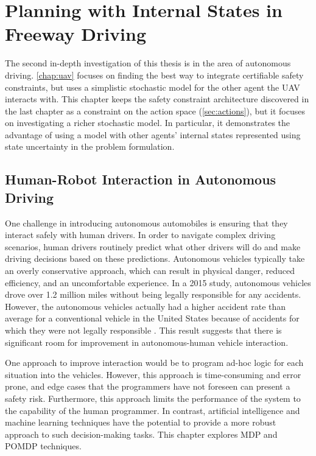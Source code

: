 \chapter{Planning with Internal States in Freeway Driving} \label{chap:multilane}

The second in-depth investigation of this thesis is in the area of autonomous driving.
\cref{chap:uav} focuses on finding the best way to integrate certifiable safety constraints, but uses a simplistic stochastic model for the other agent the UAV interacts with.
This chapter keeps the safety constraint architecture discovered in the last chapter as a constraint on the action space (\cref{sec:actions}), but it focuses on investigating a richer stochastic model.
In particular, it demonstrates the advantage of using a model with other agents' internal states represented using state uncertainty in the problem formulation.

\section{Human-Robot Interaction in Autonomous Driving}

One challenge in introducing autonomous automobiles is ensuring that they interact safely with human drivers.
In order to navigate complex driving scenarios, human drivers routinely predict what other drivers will do and make driving decisions based on these predictions.
Autonomous vehicles typically take an overly conservative approach, which can result in physical danger, reduced efficiency, and an uncomfortable experience. %
In a 2015 study, autonomous vehicles drove over 1.2 million miles without being legally responsible for any accidents.
However, the autonomous vehicles actually had a higher accident rate than average for a conventional vehicle in the United States because of accidents for which they were not legally responsible \cite{schoettle2015crashes}.
This result suggests that there is significant room for improvement in autonomous-human vehicle interaction.  

One approach to improve interaction would be to program ad-hoc logic for each situation into the vehicles.
However, this approach is time-consuming and error prone, and edge cases that the programmers have not foreseen can present a safety risk.
Furthermore, this approach limits the performance of the system to the capability of the human programmer.
In contrast, artificial intelligence and machine learning techniques have the potential to provide a more robust approach to such decision-making tasks.
This chapter explores MDP and POMDP techniques.

